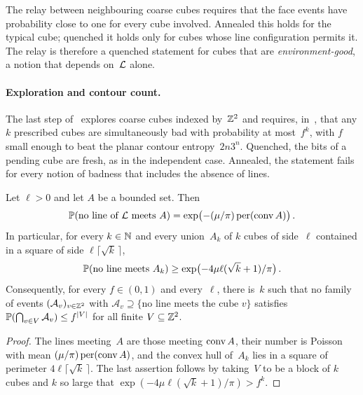 \documentclass[11pt,letterpaper]{article}
\begin{document}
The relay between neighbouring coarse cubes requires that the face events have probability close to one for every cube involved. Annealed this holds for the typical cube; quenched it holds only for cubes whose line configuration permits it. The relay is therefore a quenched statement for cubes that are \emph{environment-good}, a notion that depends on~$\cL$ alone.

\paragraph{Exploration and contour count.} The last step of~\cite{Pei26} explores coarse cubes indexed by~$\Z^2$ and requires, in~\cite[Lemma~6.3]{Pei26}, that any $k$ prescribed cubes are simultaneously bad with probability at most~$f^k$, with $f$ small enough to beat the planar contour entropy~$2n3^n$. Quenched, the bits of a pending cube are fresh, as in the independent case. Annealed, the statement fails for every notion of badness that includes the absence of lines.

\begin{proposition}
\label{prop:blob}
Let $\ell>0$ and let $A$ be a bounded set. Then
\begin{equation*}
  \P(\text{no line of }\cL\text{ meets }A)=\exp\bigl(-(\mu/\pi)\operatorname{per}(\conv A)\bigr)\,.
\end{equation*}
In particular, for every $k\in\N$ and every union~$A_k$ of $k$ cubes of side~$\ell$ contained in a square of side $\ell\lceil\sqrt k\,\rceil$,
\begin{equation*}
  \P(\text{no line meets }A_k)\ge\exp\bigl(-4\mu\ell(\sqrt k+1)/\pi\bigr)\,.
\end{equation*}
Consequently, for every $f\in(0,1)$ and every~$\ell$, there is~$k$ such that no family of events $(\mathcal A_v)_{v\in\Z^2}$ with $\mathcal A_v\supseteq\{\text{no line meets the cube }v\}$ satisfies $\P(\bigcap_{v\in V}\mathcal A_v)\le f^{\lvert V\rvert}$ for all finite $V\subseteq\Z^2$.
\end{proposition}

\begin{proof}
The lines meeting~$A$ are those meeting $\conv A$, their number is Poisson with mean $(\mu/\pi)\operatorname{per}(\conv A)$, and the convex hull of~$A_k$ lies in a square of perimeter $4\ell\lceil\sqrt k\,\rceil$. The last assertion follows by taking~$V$ to be a block of $k$ cubes and $k$ so large that $\exp(-4\mu\ell(\sqrt k+1)/\pi)>f^k$.
\end{proof}
\end{document}
